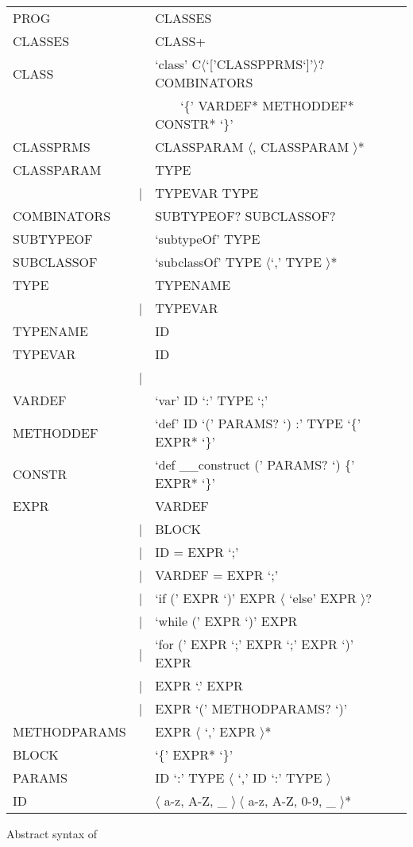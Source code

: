 \begin{listing}
	\begin{tabular}[H]{lrll}
		PROG & \lra & CLASSES \\
		CLASSES & \lra & CLASS+ \\
		CLASS & \lra & `class' C$\langle$`['CLASSPPRMS`]'$\rangle$? COMBINATORS \\
		& & ~~~~`\{' VARDEF* METHODDEF* CONSTR* `\}' \\
		CLASSPRMS & \lra & CLASSPARAM $\langle$, CLASSPARAM $\rangle$* \\
		CLASSPARAM & \lra & TYPE \\
		 & | & TYPEVAR \match TYPE \\
		COMBINATORS & \lra & SUBTYPEOF? SUBCLASSOF? \\
		SUBTYPEOF & \lra & `subtypeOf' TYPE \\
		SUBCLASSOF & \lra & `subclassOf' TYPE $\langle$`,' TYPE $\rangle$* \\
		TYPE & \lra & TYPENAME \\
		& | & TYPEVAR \\
		TYPENAME & \lra & ID \\
		TYPEVAR & \lra & ID \\
		& | & \mytype \\
		VARDEF & \lra & `var' ID `:' TYPE `;' \\
		METHODDEF & \lra & `def' ID `(' PARAMS? `) :' TYPE `\{' EXPR* `\}'  \\
		CONSTR & \lra & `def \_\_construct (' PARAMS? `) \{' EXPR* `\}' \\
		EXPR & \lra & VARDEF \\
		& | & BLOCK \\
		& | & ID = EXPR `;' \\
		& | & VARDEF = EXPR `;' \\
		& | & `if (' EXPR `)' EXPR $\langle$ `else' EXPR $\rangle$?  \\
		& | & `while (' EXPR `)' EXPR \\
		& | & `for (' EXPR `;' EXPR `;' EXPR `)' EXPR \\
		& | & EXPR `.' EXPR \\
		& | & EXPR `(' METHODPARAMS? `)' \\
		METHODPARAMS & \lra & EXPR $\langle$ `,' EXPR $\rangle$* \\
		BLOCK & \lra & `\{' EXPR* `\}' \\
		PARAMS & \lra & ID `:' TYPE $\langle$ `,' ID `:' TYPE $\rangle$ \\
		ID & \lra & $\langle$ a-z, A-Z, \_ $\rangle~\langle$ a-z, A-Z, 0-9, \_ $\rangle$* \\
	\end{tabular}
	\caption{Abstract syntax of \ooplss}
	\label{lst:abstractSyntax}
\end{listing}

